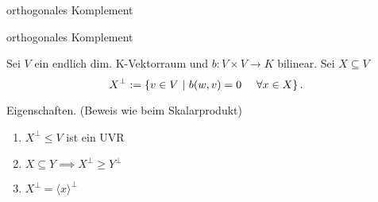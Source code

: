 \documentclass[class=article, crop=false]{standalone}
\begin{document}
\begin{zettel}{orthogonales Komplement}
\begin{flashcard}[ifniw3zp]{orthogonales Komplement}
	\begin{definition}
		Sei $V$ ein endlich dim. K-Vektorraum und $b: V \times V \to  K $ bilinear. Sei $X \subseteq V$
		\[
			X^{\perp} := \set{v \in  V}{b (w,v ) = 0 \quad \forall x \in  X}
		.\]
	\end{definition}

\end{flashcard}

\begin{remark}
	Eigenschaften. (Beweis wie beim Skalarprodukt)
	\begin{enumerate}
		\item $X^{\perp} \leq V$ ist ein UVR
		\item $X \subseteq Y \implies X^{\perp} \geq Y^\perp$
		\item $X^{\perp}= \langle x\rangle^\perp$
	\end{enumerate}
\end{remark}

\end{zettel}
\end{document}
